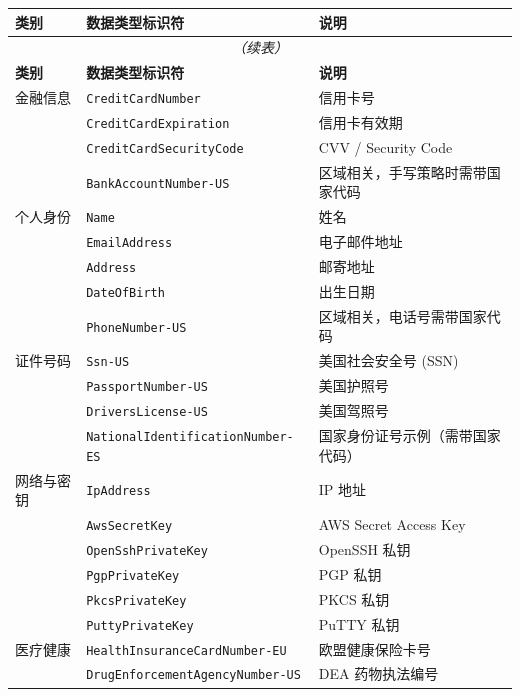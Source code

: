 \documentclass[12pt, a4paper]{article}
\begin{document}
\begin{center}
\begin{longtable}{@{}lll@{}}
\toprule
\textbf{类别} & \textbf{数据类型标识符} & \textbf{说明} \\
\midrule
\endfirsthead
\multicolumn{3}{c}{\textit{（续表）}} \\
\toprule
\textbf{类别} & \textbf{数据类型标识符} & \textbf{说明} \\
\midrule
\endhead
\bottomrule
\endfoot
金融信息 & \texttt{CreditCardNumber} & 信用卡号 \\
         & \texttt{CreditCardExpiration} & 信用卡有效期 \\
         & \texttt{CreditCardSecurityCode} & CVV / Security Code \\
         & \texttt{BankAccountNumber-US} & 区域相关，手写策略时需带国家代码 \\
\midrule
个人身份  & \texttt{Name} & 姓名 \\
         & \texttt{EmailAddress} & 电子邮件地址 \\
         & \texttt{Address} & 邮寄地址 \\
         & \texttt{DateOfBirth} & 出生日期 \\
         & \texttt{PhoneNumber-US} & 区域相关，电话号需带国家代码 \\
\midrule
证件号码  & \texttt{Ssn-US} & 美国社会安全号 (SSN) \\
         & \texttt{PassportNumber-US} & 美国护照号 \\
         & \texttt{DriversLicense-US} & 美国驾照号 \\
         & \texttt{NationalIdentificationNumber-ES} & 国家身份证号示例（需带国家代码） \\
\midrule
网络与密钥 & \texttt{IpAddress} & IP 地址 \\
          & \texttt{AwsSecretKey} & AWS Secret Access Key \\
          & \texttt{OpenSshPrivateKey} & OpenSSH 私钥 \\
          & \texttt{PgpPrivateKey} & PGP 私钥 \\
          & \texttt{PkcsPrivateKey} & PKCS 私钥 \\
          & \texttt{PuttyPrivateKey} & PuTTY 私钥 \\
\midrule
医疗健康  & \texttt{HealthInsuranceCardNumber-EU} & 欧盟健康保险卡号 \\
         & \texttt{DrugEnforcementAgencyNumber-US} & DEA 药物执法编号 \\
\end{longtable}
\end{center}
\end{document}
